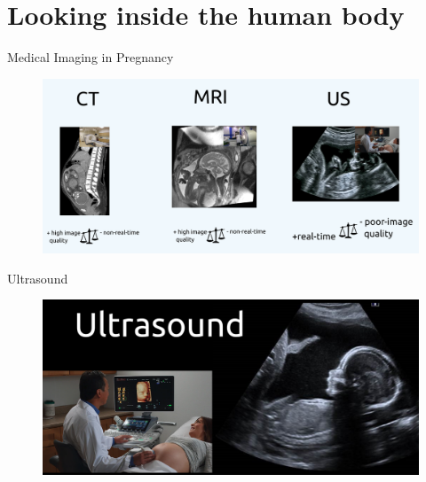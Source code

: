 \section{Looking inside the human body}


{
\begin{frame}{Medical Imaging in Pregnancy}
      \begin{figure}
        \centering
        \includegraphics[width=1.0\textwidth]{./figures/medical-imaging-in-pregnancy/ct-mr-us/versions/drawing-v01.png}
      \end{figure}
\end{frame}
}

{
\begin{frame}{Ultrasound}
      \begin{figure}
        \centering
        \includegraphics[width=1.0\textwidth]{./figures/medical-imaging-in-pregnancy/us/versions/drawing-v00.png}
      \end{figure}
\end{frame}
}


